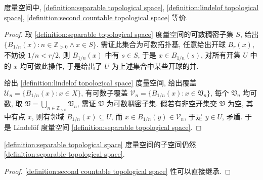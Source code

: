 \begin{lemma}
    度量空间中, \ref{definition:separable topological space}, \ref{definition:lindelof topological space}, \ref{definition:second countable topological space} 等价.

    \begin{proof}
        取 \ref{definition:separable topological space} 度量空间的可数稠密子集 \(S\), 给出 \(\{B_{1/n} (x) : n \in \mathbb{Z}_{> 0}\land x \in S\}\). 需证此集合为可数拓扑基,
        任意给出开球 \(B_r (x)\), 不妨设 \(1/n < r/2\), 则 \(B_{1/n} (x)\) 中有 \(s \in S\), 于是 \(x \in B_{1/n} (s)\),
        对所有开集 \(U\) 中的 \(x\) 均可做此操作, 于是给出了 \(U\) 为上述集合中某些开球的并.

        给出 \ref{definition:lindelof topological space} 度量空间, 给出覆盖 \(\mathcal{U}_n = \{B_{1/n} (x) : x \in X\}\), 有可数子覆盖 \(\mathcal{V}_n = \{B_{1/n} (x) : x \in \mathfrak{V}_n\}\),
        每个 \(\mathfrak{V}_n\) 均可数, 取 \(\mathfrak{V} = \bigcup_{n \in \mathbb{Z}_{> 0}} \mathfrak{V}_n\), 需证 \(\mathfrak{V}\) 为可数稠密子集.
        假若有非空开集交 \(\mathfrak{V}\) 为空, 其中有点 \(x\), 则有邻域 \(B_{1/n} (x) \subseteq U\), 而 \(x \in B_{1/n} (y) \in \mathcal{V}_n\),
        于是 \(y \in U\), 矛盾. 于是 Lindelöf 度量空间 \ref{definition:separable topological space}.
    \end{proof}
\end{lemma}

\begin{lemma}
    \ref{definition:separable topological space} 度量空间的子空间仍然 \ref{definition:separable topological space}.

    \begin{proof}
        \ref{definition:second countable topological space} 性可以直接继承.
    \end{proof}
\end{lemma}

